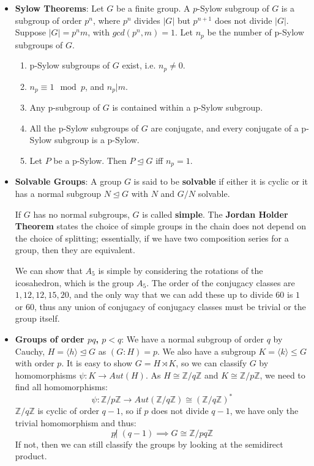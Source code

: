 \documentclass[11pt, oneside]{amsart}   	%
\theoremstyle{definition}
\begin{document}
\begin{itemize}

	\item \textbf{Sylow Theorems}: Let $G$ be a finite group. A $p$-Sylow subgroup of $G$ is a subgroup of order $p^n$, where $p^n$ divides 
	$|G|$ but $p^{n + 1}$ does not divide $|G|$. Suppose $|G| = p^nm$, with $gcd(p^n, m) = 1$. Let $n_p$ be the number of p-Sylow subgroups 
	of $G$.
	
		\begin{enumerate}
		
			\item p-Sylow subgroups of $G$ exist, i.e. $n_p \neq 0$.
			
			\item $n_p \equiv 1 \mod p$, and $n_p | m$.
			
			\item Any p-subgroup of $G$ is contained within a p-Sylow subgroup.
			
			\item All the p-Sylow subgroups of $G$ are conjugate, and every conjugate of a p-Sylow subgroup is a p-Sylow.
			
			\item Let $P$ be a p-Sylow. Then $P\trianglelefteq G$ iff $n_p = 1$.
		
		\end{enumerate}
		
	\item \textbf{Solvable Groups}: A group $G$ is said to be \textbf{solvable} if either it is cyclic or it has a normal subgroup $N \trianglelefteq 
	G$ with $N$ and $G/N$ solvable.
	
	If $G$ has no normal subgroups, $G$ is called \textbf{simple}. The \textbf{Jordan Holder Theorem} states the choice of simple groups 
	in the chain does not depend on the choice of splitting; essentially, if we have two composition series for a group, then they are 
	equivalent.
	
	We can show that $A_5$ is simple by considering the rotations of the icosahedron, which is the group $A_5$. The order of the conjugacy 
	classes are $1, 12, 12, 15, 20$, and the only way that we can add these up to divide $60$ is $1$ or $60$, thus any union of conjugacy of 
	conjugacy classes must be trivial or the group itself.
	
	\item \textbf{Groups of order $pq$, $p < q$}: We have a normal subgroup of order $q$ by Cauchy, $H = \langle h\rangle\trianglelefteq G$ as $(G : 
	H) = p$. We also have a subgroup $K = \langle k\rangle\leq G$ with order $p$. It is easy to show $G = H\rtimes K$, so we can classify $G$ by 
	homomorphisms $\psi : K\rightarrow Aut(H)$. As $H\cong \mathbb Z/q\mathbb Z$ and $K\cong\mathbb Z/p\mathbb Z$, we need to find all 
	homomorphisms:
	$$
		\psi: \mathbb Z/p\mathbb Z\rightarrow Aut(\mathbb Z/q\mathbb Z)\cong (\mathbb Z/q\mathbb Z)^*
	$$
	$\mathbb Z/q\mathbb Z$ is cyclic of order $q - 1$, so if $p$ does not divide $q - 1$, we have only the trivial homomorphism and thus:
	$$
		p\not | \;(q - 1)\implies G\cong \mathbb Z/pq\mathbb Z
	$$
	If not, then we can still classify the groups by looking at the semidirect product.
	

\end{itemize}
\end{document}
